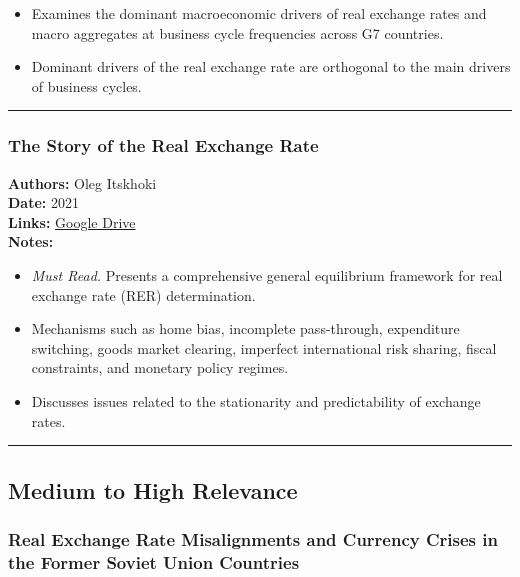 \documentclass[
  11pt,
]{article}
\providecommand{\tightlist}{%
  \setlength{\itemsep}{0pt}\setlength{\parskip}{0pt}}
\begin{document}
\begin{itemize}
\tightlist
\item
  Examines the dominant macroeconomic drivers of real exchange rates and
  macro aggregates at business cycle frequencies across G7 countries.
\item
  Dominant drivers of the real exchange rate are orthogonal to the main
  drivers of business cycles.
\end{itemize}

\begin{center}\rule{0.5\linewidth}{0.5pt}\end{center}

\subsubsection{The Story of the Real Exchange
Rate}\label{the-story-of-the-real-exchange-rate}

\textbf{Authors:} Oleg Itskhoki\\
\textbf{Date:} 2021\\
\textbf{Links:}
\href{https://drive.google.com/file/d/1vhVbum9po2xoiaPT8suUqOqjDg5o8EkI/view?usp=sharing}{Google
Drive}\\
\textbf{Notes:}

\begin{itemize}
\tightlist
\item
  \emph{Must Read.} Presents a comprehensive general equilibrium
  framework for real exchange rate (RER) determination.
\item
  Mechanisms such as home bias, incomplete pass-through, expenditure
  switching, goods market clearing, imperfect international risk
  sharing, fiscal constraints, and monetary policy regimes.
\item
  Discusses issues related to the stationarity and predictability of
  exchange rates.
\end{itemize}

\begin{center}\rule{0.5\linewidth}{0.5pt}\end{center}

\subsection{Medium to High Relevance}\label{medium-to-high-relevance}

\subsubsection{Real Exchange Rate Misalignments and Currency Crises in
the Former Soviet Union
Countries}\label{real-exchange-rate-misalignments-and-currency-crises-in-the-former-soviet-union-countries}
\end{document}
